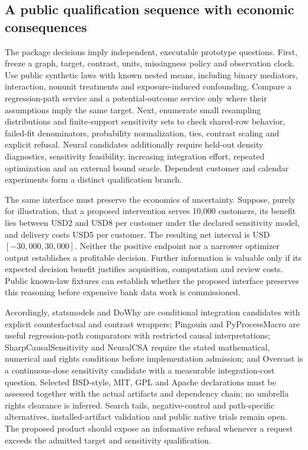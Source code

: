 \subsection{A public qualification sequence with economic consequences}
The package decisions imply independent, executable prototype questions. First, freeze a graph, target, contrast, units, missingness policy and observation clock. Use public synthetic laws with known nested means, including binary mediators, interaction, nonunit treatments and exposure-induced confounding. Compare a regression-path service and a potential-outcome service only where their assumptions imply the same target. Next, enumerate small resampling distributions and finite-support sensitivity sets to check shared-row behavior, failed-fit denominators, probability normalization, ties, contrast scaling and explicit refusal. Neural candidates additionally require held-out density diagnostics, sensitivity feasibility, increasing integration effort, repeated optimization and an external bound oracle. Dependent customer and calendar experiments form a distinct qualification branch.\cite{exec25_pymed_choice}

The same interface must preserve the economics of uncertainty. Suppose, purely for illustration, that a proposed intervention serves 10,000 customers, its benefit lies between USD2 and USD8 per customer under the declared sensitivity model, and delivery costs USD5 per customer. The resulting net interval is USD$[-30{,}000,30{,}000]$. Neither the positive endpoint nor a narrower optimizer output establishes a profitable decision. Further information is valuable only if its expected decision benefit justifies acquisition, computation and review costs. Public known-law fixtures can establish whether the proposed interface preserves this reasoning before expensive bank data work is commissioned.\cite{exec25_pymed_choice}

Accordingly, statsmodels and DoWhy are conditional integration candidates with explicit counterfactual and contrast wrappers; Pingouin and PyProcessMacro are useful regression-path comparators with restricted causal interpretations; SharpCausalSensitivity and NeuralCSA require the stated mathematical, numerical and rights conditions before implementation admission; and Overcast is a continuous-dose sensitivity candidate with a measurable integration-cost question. Selected BSD-style, MIT, GPL and Apache declarations must be assessed together with the actual artifacts and dependency chain; no umbrella rights clearance is inferred. Search tails, negative-control and path-specific alternatives, installed-artifact validation and public native trials remain open. The proposed product should expose an informative refusal whenever a request exceeds the admitted target and sensitivity qualification.\cite{exec25_pymed_statsmodels,exec25_pymed_pingouin,exec25_pymed_dowhy,exec25_pymed_process,exec25_pymed_sharp,exec25_pymed_neuralcsa,exec25_pymed_overcast,exec25_pymed_choice}
